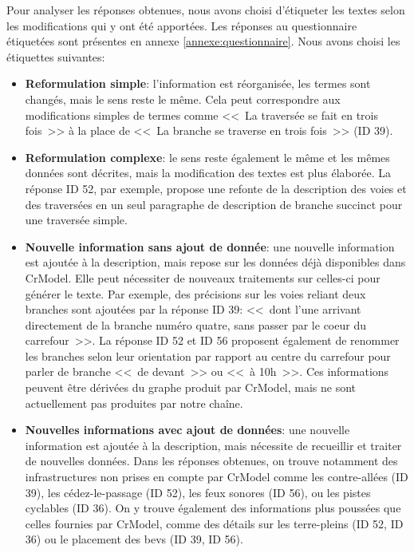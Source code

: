 \newpar{}

\begin{samepage}
    Pour analyser les réponses obtenues, nous avons choisi d'étiqueter les textes selon les modifications qui y ont été apportées. Les réponses au questionnaire étiquetées sont présentes en annexe \ref{annexe:questionnaire}. Nous avons choisi les étiquettes suivantes:

    \begin{itemize}
        \item \textbf{Reformulation simple}: l'information est réorganisée, les termes sont changés, mais le sens reste le même. Cela peut correspondre aux modifications simples de termes comme <<~La traversée se fait en trois fois~>> à la place de <<~La branche se traverse en trois fois~>> (ID 39).
        \item \textbf{Reformulation complexe}: le sens reste également le même et les mêmes données sont décrites, mais la modification des textes est plus élaborée. La réponse ID 52, par exemple, propose une refonte de la description des voies et des traversées en un seul paragraphe de description de branche succinct pour une traversée simple.
        \item \textbf{Nouvelle information sans ajout de donnée}: une nouvelle information est ajoutée à la description, mais repose sur les données déjà disponibles dans CrModel. Elle peut nécessiter de nouveaux traitements sur celles-ci pour générer le texte. Par exemple, des précisions sur les voies reliant deux branches sont ajoutées par la réponse ID 39: <<~dont l’une arrivant directement de la branche numéro quatre, sans passer par le coeur du carrefour~>>. La réponse ID 52 et ID 56 proposent également de renommer les branches selon leur orientation par rapport au centre du carrefour pour parler de branche <<~de devant~>> ou <<~à 10h~>>. Ces informations peuvent être dérivées du graphe produit par CrModel, mais ne sont actuellement pas produites par notre chaîne.
        \item \textbf{Nouvelles informations avec ajout de données}: une nouvelle information est ajoutée à la description, mais nécessite de recueillir et traiter de nouvelles données. Dans les réponses obtenues, on trouve notamment des infrastructures non prises en compte par CrModel comme les contre-allées (ID 39), les cédez-le-passage (ID 52), les feux sonores (ID 56), ou les pistes cyclables (ID 36). On y trouve également des informations plus poussées que celles fournies par CrModel, comme des détails sur les terre-pleins (ID 52, ID 36) ou le placement des \glspl{bev} (ID 39, ID 56).
    \end{itemize}
\end{samepage}

